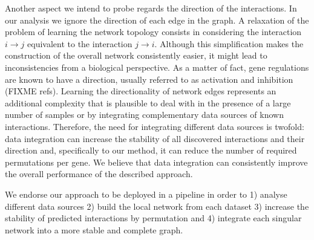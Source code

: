 Another aspect we intend to probe regards the direction of the interactions. In our analysis we ignore the direction of each edge in the graph. A relaxation of the problem of learning the network topology consists in considering the interaction $i \rightarrow j$ equivalent to the interaction $j \rightarrow i$. Although this simplification makes the construction of the overall network consistently easier, it might lead to inconsistencies from a biological perspective. As a matter of fact, gene regulations are known to have a direction, usually referred to as activation and inhibition (FIXME refs). Learning the directionality of network edges represents an additional complexity that is plausible to deal with in the presence of a large number of samples or by integrating complementary data sources of known interactions. 
Therefore, the need for integrating different data sources is twofold: data integration can increase the stability of all discovered interactions and their direction and, specifically to our method, it can reduce the number of required permutations per gene. We believe that data integration can consistently  improve the overall performance of the described approach. 

We endorse our approach to be deployed in a pipeline in order to 1) analyse different data sources 2) build the local network from each dataset 3) increase the stability of predicted interactions by permutation and 4) integrate each singular network into a more stable and complete graph.


